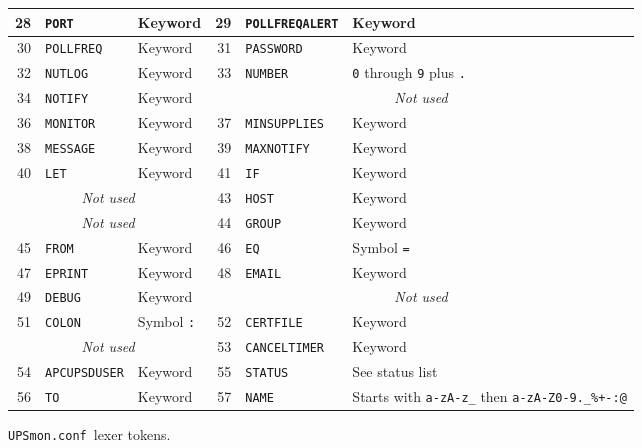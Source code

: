 \documentclass[12pt]{article}
\newcommand{\UPSmonconf}{\textcolor{UPSMONCOLOUR}{\texttt{UPSmon.conf}}}
\begin{document}
\begin{description}
\begin{figure}[ht]
\begin{center}
\begin{tabular}{|r|l|p{0.17\LinePrinterwidth}||r|l|p{0.32\LinePrinterwidth}|}
28 & \texttt{PORT}            & Keyword               &
29 & \texttt{POLLFREQALERT}   & Keyword               \\ \hline
30 & \texttt{POLLFREQ}        & Keyword               &
31 & \texttt{PASSWORD}        & Keyword               \\ \hline
32 & \texttt{NUTLOG}          & Keyword               &
33 & \texttt{NUMBER}          & \texttt{0} through \texttt{9} plus \texttt{.} \\ \hline
34 & \texttt{NOTIFY}          & Keyword               &
\multicolumn{3}{|c|}{\textit{Not used}}               \\ \hline
36 & \texttt{MONITOR}         & Keyword               &
37 & \texttt{MINSUPPLIES}     & Keyword               \\ \hline
38 & \texttt{MESSAGE}         & Keyword               &
39 & \texttt{MAXNOTIFY}       & Keyword               \\ \hline
40 & \texttt{LET}             & Keyword               &
41 & \texttt{IF}              & Keyword               \\ \hline
\multicolumn{3}{|c||}{\textit{Not used}}              &
43 & \texttt{HOST}            & Keyword               \\ \hline
\multicolumn{3}{|c||}{\textit{Not used}}              &
44 & \texttt{GROUP}           & Keyword               \\ \hline
45 & \texttt{FROM}            & Keyword               &
46 & \texttt{EQ}              & Symbol \texttt{=}     \\ \hline
47 & \texttt{EPRINT}          & Keyword               &
48 & \texttt{EMAIL}           & Keyword               \\ \hline
49 & \texttt{DEBUG}           & Keyword               &
\multicolumn{3}{|c||}{\textit{Not used}}              \\ \hline
51 & \texttt{COLON}           & Symbol \texttt{:}     &
52 & \texttt{CERTFILE}        & Keyword               \\ \hline
\multicolumn{3}{|c||}{\textit{Not used}}              &
53 & \texttt{CANCELTIMER}     & Keyword               \\ \hline
54 & \texttt{APCUPSDUSER}     & Keyword               &
55 & \texttt{STATUS}          & See status list       \\ \hline
56 & \texttt{TO}              & Keyword               &
57 & \texttt{NAME}            & Starts with \texttt{a-zA-z\_}
                                then \texttt{a-zA-Z0-9.\_\%+-:@}  \\ \hline
\end{tabular}
\caption{\UPSmonconf\ lexer tokens.\label{fig:tokens}}
\end{center}
\end{figure}


\end{description}
\end{document}
